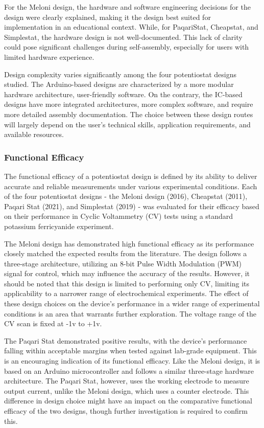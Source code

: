 \documentclass{article}
\begin{document}
For the Meloni design, the hardware and software engineering decisions for the design were clearly explained, making it the design best suited for implementation in an educational context. While, for PaqariStat, Cheapstat, and Simplestat, the hardware design is not well-documented. This lack of clarity could pose significant challenges during self-assembly, especially for users with limited hardware experience.


Design complexity varies significantly among the four potentiostat designs studied. The Arduino-based designs are characterized by a more modular hardware architecture, user-friendly software. On the contrary, the IC-based designs have more integrated architectures, more complex software, and require more detailed assembly documentation. The choice between these design routes will largely depend on the user's technical skills, application requirements, and available resources.


\subsubsection*{Functional Efficacy}
The functional efficacy of a potentiostat design is defined by its ability to deliver accurate and reliable measurements under various experimental conditions. Each of the four potentiostat designs - the Meloni design (2016), Cheapstat (2011), Paqari Stat (2021), and Simplestat (2019) - was evaluated for their efficacy based on their performance in Cyclic Voltammetry (CV) tests using a standard potassium ferricyanide experiment.


The Meloni design has demonstrated high functional efficacy as its performance closely matched the expected results from the literature. The design follows a three-stage architecture, utilizing an 8-bit Pulse Width Modulation (PWM) signal for control, which may influence the accuracy of the results. However, it should be noted that this design is limited to performing only CV, limiting its applicability to a narrower range of electrochemical experiments. The effect of these design choices on the device's performance in a wider range of experimental conditions is an area that warrants further exploration. The voltage range of the CV scan is fixed at -1v to +1v.


The Paqari Stat demonstrated positive results, with the device's performance falling within acceptable margins when tested against lab-grade equipment. This is an encouraging indication of its functional efficacy. Like the Meloni design, it is based on an Arduino microcontroller and follows a similar three-stage hardware architecture. The Paqari Stat, however, uses the working electrode to measure output current, unlike the Meloni design, which uses a counter electrode. This difference in design choice might have an impact on the comparative functional efficacy of the two designs, though further investigation is required to confirm this.
\end{document}
